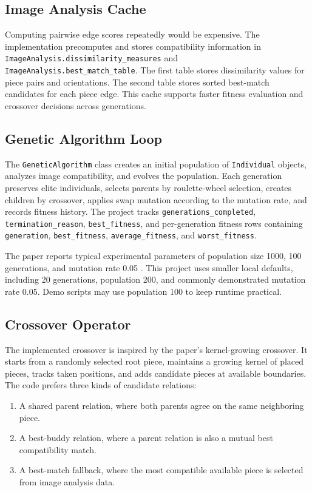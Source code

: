 \documentclass[12pt,a4paper]{article}
\begin{document}
\subsection{Image Analysis Cache}
Computing pairwise edge scores repeatedly would be expensive. The implementation precomputes and stores compatibility information in \texttt{ImageAnalysis.dissimilarity\_measures} and \texttt{ImageAnalysis.best\_match\_table}. The first table stores dissimilarity values for piece pairs and orientations. The second table stores sorted best-match candidates for each piece edge. This cache supports faster fitness evaluation and crossover decisions across generations.

\subsection{Genetic Algorithm Loop}
The \texttt{GeneticAlgorithm} class creates an initial population of \texttt{Individual} objects, analyzes image compatibility, and evolves the population. Each generation preserves elite individuals, selects parents by roulette-wheel selection, creates children by crossover, applies swap mutation according to the mutation rate, and records fitness history. The project tracks \texttt{generations\_completed}, \texttt{termination\_reason}, \texttt{best\_fitness}, and per-generation fitness rows containing \texttt{generation}, \texttt{best\_fitness}, \texttt{average\_fitness}, and \texttt{worst\_fitness}.

The paper reports typical experimental parameters of population size 1000, 100 generations, and mutation rate 0.05 \cite{sholomon2016automatic}. This project uses smaller local defaults, including 20 generations, population 200, and commonly demonstrated mutation rate 0.05. Demo scripts may use population 100 to keep runtime practical.

\subsection{Crossover Operator}
The implemented crossover is inspired by the paper's kernel-growing crossover. It starts from a randomly selected root piece, maintains a growing kernel of placed pieces, tracks taken positions, and adds candidate pieces at available boundaries. The code prefers three kinds of candidate relations:
\begin{enumerate}
    \item A shared parent relation, where both parents agree on the same neighboring piece.
    \item A best-buddy relation, where a parent relation is also a mutual best compatibility match.
    \item A best-match fallback, where the most compatible available piece is selected from image analysis data.
\end{enumerate}
\end{document}

